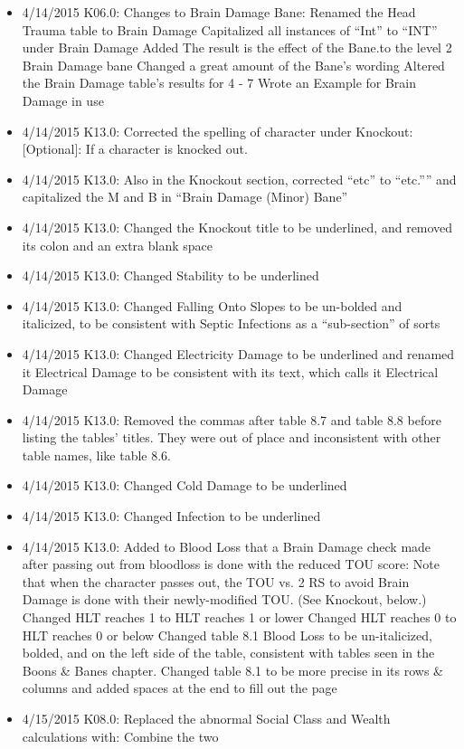\documentclass[oneside,11pt,english]{book}
\begin{document}
{\begin{itemize}
\item 4/14/2015 K06.0: Changes to Brain Damage Bane: 
Renamed the Head Trauma table to Brain Damage 
Capitalized all instances of “Int” to “INT” under Brain Damage 
Added The result is the effect of the Bane.to the level 2 Brain Damage bane 
 Changed a great amount of the Bane’s wording 
 Altered the Brain Damage table’s results for 4 - 7 
 Wrote an Example for Brain Damage in use 
\item 4/14/2015 K13.0: Corrected the spelling of character under Knockout: [Optional]: If a character is 
knocked out. 
\item 4/14/2015 K13.0: Also in the Knockout section, corrected “etc” to “etc.”” and capitalized the M and B in 
“Brain Damage (Minor) Bane” 
\item 4/14/2015 K13.0: Changed the Knockout title to be underlined, and removed its colon and an extra blank 
space 
\item 4/14/2015 K13.0: Changed Stability to be underlined 
\item 4/14/2015 K13.0: Changed Falling Onto Slopes to be un-bolded and italicized, to be consistent with 
Septic Infections as a “sub-section” of sorts 
\item 4/14/2015 K13.0: Changed Electricity Damage to be underlined and renamed it Electrical Damage to be 
consistent with its text, which calls it Electrical Damage 
\item 4/14/2015 K13.0: Removed the commas after table 8.7 and table 8.8 before listing the tables’ titles. They 
were out of place and inconsistent with other table names, like table 8.6. 
\item 4/14/2015 K13.0: Changed Cold Damage to be underlined 
\item 4/14/2015 K13.0: Changed Infection to be underlined 
\item 4/14/2015 K13.0: Added to Blood Loss that a Brain Damage check made after passing out from bloodloss 
is done with the reduced TOU score: Note that when the character passes out, the TOU vs. 2 RS to avoid 
Brain Damage is done with their newly-modified TOU. (See Knockout, below.) 
Changed HLT reaches 1 to HLT reaches 1 or lower 
Changed HLT reaches 0 to HLT reaches 0 or below 
Changed table 8.1 Blood Loss to be un-italicized, bolded, and on the left side of the table, 
consistent with tables seen in the Boons \& Banes chapter. 
Changed table 8.1 to be more precise in its rows \& columns and added spaces at the end to fill 
out the page 
\item 4/15/2015 K08.0: Replaced the abnormal Social Class and Wealth calculations with: Combine the two 

\end{itemize}}
\end{document}
